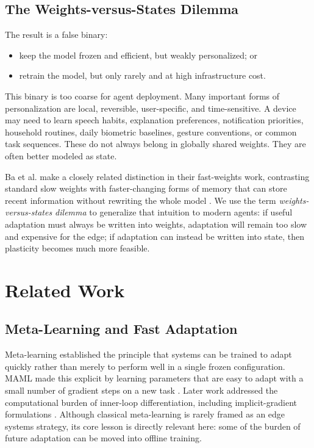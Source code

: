 \documentclass[11pt,a4paper]{article}
\begin{document}
\subsection{The Weights-versus-States Dilemma}

The result is a false binary:
\begin{itemize}[noitemsep]
    \item keep the model frozen and efficient, but weakly personalized; or
    \item retrain the model, but only rarely and at high infrastructure cost.
\end{itemize}

This binary is too coarse for agent deployment. Many important forms of personalization are local, reversible, user-specific, and time-sensitive. A device may need to learn speech habits, explanation preferences, notification priorities, household routines, daily biometric baselines, gesture conventions, or common task sequences. These do not always belong in globally shared weights. They are often better modeled as state.

Ba et al. make a closely related distinction in their fast-weights work, contrasting standard slow weights with faster-changing forms of memory that can store recent information without rewriting the whole model \cite{ba2016fastweights}. We use the term \emph{weights-versus-states dilemma} to generalize that intuition to modern agents: if useful adaptation must always be written into weights, adaptation will remain too slow and expensive for the edge; if adaptation can instead be written into state, then plasticity becomes much more feasible.

\section{Related Work}

\subsection{Meta-Learning and Fast Adaptation}

Meta-learning established the principle that systems can be trained to adapt quickly rather than merely to perform well in a single frozen configuration. MAML made this explicit by learning parameters that are easy to adapt with a small number of gradient steps on a new task \cite{finn2017maml}. Later work addressed the computational burden of inner-loop differentiation, including implicit-gradient formulations \cite{rajeswaran2019implicit}. Although classical meta-learning is rarely framed as an edge systems strategy, its core lesson is directly relevant here: some of the burden of future adaptation can be moved into offline training.
\end{document}
